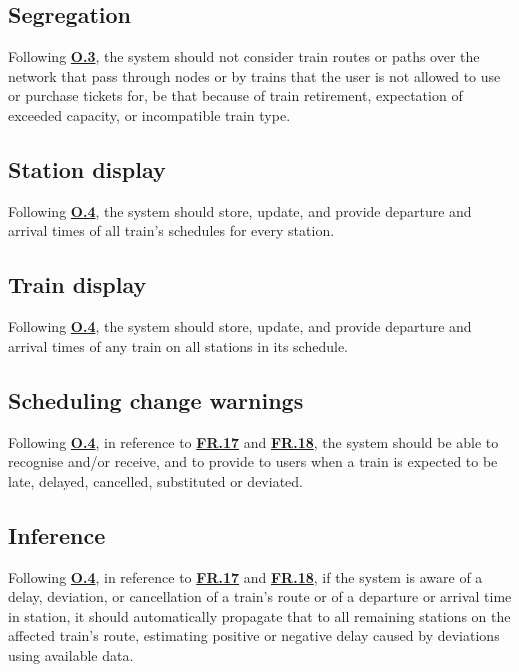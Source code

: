\documentclass[12pt]{article}
\renewcommand\bf[1]{\textbf{#1}}
\newcommand\hyl[1]{\hyperref[#1]{\bf{#1}}}
\begin{document}
\subsection{Segregation} \label{FR.16}
Following \hyl{O.3}, the system should not consider train routes or paths over the network that pass through nodes or by trains that the user is  not allowed to use or purchase tickets for, be that because of train retirement, expectation of exceeded capacity, or incompatible train type.

\subsection{Station display} \label{FR.17}
Following \hyl{O.4}, the system should store, update, and provide departure and arrival times of all train's schedules for every station.

\subsection{Train display} \label{FR.18}
Following \hyl{O.4}, the system should store, update, and provide departure and arrival times of any train on all stations in its schedule.

\subsection{Scheduling change warnings} \label{FR.19}
Following \hyl{O.4}, in reference to \hyl{FR.17} and \hyl{FR.18}, the system should be able to recognise and/or receive, and to provide to users when a train is expected to be late, delayed, cancelled, substituted or deviated.

\subsection{Inference} \label{FR.20}
Following \hyl{O.4}, in reference to \hyl{FR.17} and \hyl{FR.18}, if the system is aware of a delay, deviation, or cancellation of a train's route or of a departure or arrival time in station, it should automatically propagate that to all remaining stations on the affected train's route, estimating positive or negative delay caused by deviations using available data.
\end{document}
